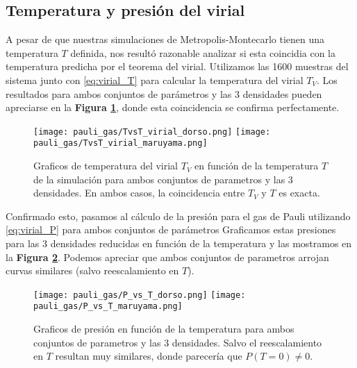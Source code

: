 \subsection{Temperatura y presión del virial}

A pesar de que nuestras simulaciones de Metropolis-Montecarlo tienen una temperatura $T$ definida, nos resultó razonable analizar si esta coincidia con la temperatura predicha por el teorema del virial.
Utilizamos las 1600 muestras del sistema junto con \eqref{eq:virial_T} para calcular la temperatura del virial $T_V$.
Los resultados para ambos conjuntos de parámetros y las 3 densidades pueden apreciarse en la \textbf{Figura \ref{fig:TvsT_sim}}, donde esta coincidencia se confirma perfectamente.

\begin{figure}[H]
	\centering	%
	\texttt{[image: pauli\_gas/TvsT\_virial\_dorso.png]}
	\texttt{[image: pauli\_gas/TvsT\_virial\_maruyama.png]}
	\caption{Graficos de temperatura del virial $T_V$ en función de la temperatura $T$ de la simulación para ambos conjuntos de parametros y las 3 densidades.
	En ambos casos, la coincidencia entre $T_V$ y $T$ es exacta.}
	\label{fig:TvsT_sim}
\end{figure}

Confirmado esto, pasamos al cálculo de la presión para el gas de Pauli utilizando \eqref{eq:virial_P} para ambos conjuntos de parámetros
Graficamos estas presiones para las 3 densidades reducidas en función de la temperatura y las mostramos en la \textbf{Figura \ref{fig:PvsT_sim}}.
Podemos apreciar que ambos conjuntos de parametros arrojan curvas similares (salvo reescalamiento en $T$).

\begin{figure}[H]
	\centering	%
	\texttt{[image: pauli\_gas/P\_vs\_T\_dorso.png]}
	\texttt{[image: pauli\_gas/P\_vs\_T\_maruyama.png]}
	\caption{Graficos de presión en función de la temperatura para ambos conjuntos de parametros y las 3 densidades.
	  Salvo el reescalamiento en $T$ resultan muy similares, donde parecería que $P(T=0)\neq0$.}
	\label{fig:PvsT_sim}
\end{figure}

